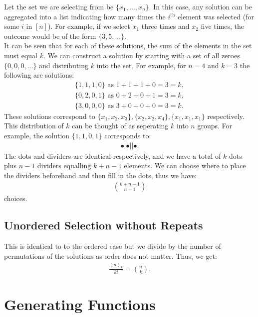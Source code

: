 \documentclass[a4paper, 12pt, twoside]{article}
\begin{document}
Let the set we are selecting from be $\{x_1, \ldots, x_n\}$. In this case, 
any solution can be aggregated into a list indicating how
many times the $i^{\text{th}}$ element was selected (for some $i$ in $[n]$).
For example, if we select $x_1$ three times and $x_2$ five times, 
the outcome would be of the form $\{3, 5, \ldots\}$.
\\[\baselineskip]
It can be seen that for each of these solutions, the sum of the elements in
the set must equal $k$. We can construct a solution by starting with a set
of all zeroes $\{0, 0, 0, \ldots\}$ and distributing $k$ into the set. For
example, for $n = 4$ and $k = 3$ the following are solutions: \begin{gather*}
  \{1, 1, 1, 0\} \text{ as } 1 + 1 + 1 + 0 = 3 = k, \\
  \{0, 2, 0, 1\} \text{ as } 0 + 2 + 0 + 1 = 3 = k, \\
  \{3, 0, 0, 0\} \text{ as } 3 + 0 + 0 + 0 = 3 = k.
\end{gather*} These solutions correspond to $\{x_1, x_2, x_3\}, 
\{x_2, x_2, x_4\}, \{x_1, x_1, x_1\}$ respectively.
\\[\baselineskip]
This distribution of $k$ can be thought of as seperating $k$ into $n$
groups. For example, the solution $\{1, 1, 0, 1\}$ corresponds to: \begin{gather*}
  \bullet | \bullet | | \bullet.
\end{gather*} The dots and dividers are identical respectively, and we
have a total of $k$ dots plus $n - 1$ dividers equalling $k + n - 1$
elements. We can choose where to place the dividers beforehand and
then fill in the dots, thus we have: \begin{gather*}
  {k + n - 1 \choose n - 1}
\end{gather*} choices.

\subsection{Unordered Selection without Repeats}

This is identical to to the ordered case but we divide by the number
of permutations of the solutions as order does not matter. Thus, we get:
\begin{gather*}
  \frac{(n)_k}{k!} = {n \choose k}.
\end{gather*}

\section{Generating Functions}
\end{document}
